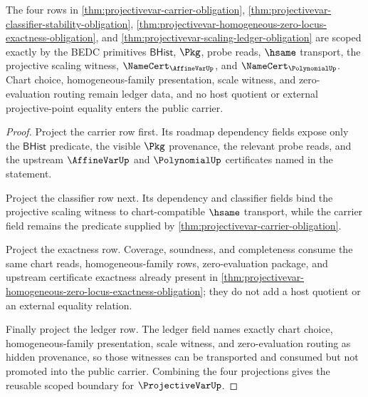 \begin{theorem}
\label{thm:projectivevar-scoped-primitive-binding}
The four rows in \autoref{thm:projectivevar-carrier-obligation}, \autoref{thm:projectivevar-classifier-stability-obligation}, \autoref{thm:projectivevar-homogeneous-zero-locus-exactness-obligation}, and \autoref{thm:projectivevar-scaling-ledger-obligation} are scoped exactly by the BEDC primitives $\mathsf{BHist}$, $\Pkg$, probe reads, $\hsame$ transport, the projective scaling witness, $\NameCert_{\AffineVarUp}$, and $\NameCert_{\PolynomialUp}$. Chart choice, homogeneous-family presentation, scale witness, and zero-evaluation routing remain ledger data, and no host quotient or external projective-point equality enters the public carrier.
\end{theorem}
\begin{proof}
Project the carrier row first. Its roadmap dependency fields expose only the $\mathsf{BHist}$ predicate, the visible $\Pkg$ provenance, the relevant probe reads, and the upstream $\AffineVarUp$ and $\PolynomialUp$ certificates named in the statement.

Project the classifier row next. Its dependency and classifier fields bind the projective scaling witness to chart-compatible $\hsame$ transport, while the carrier field remains the predicate supplied by \autoref{thm:projectivevar-carrier-obligation}.

Project the exactness row. Coverage, soundness, and completeness consume the same chart reads, homogeneous-family rows, zero-evaluation package, and upstream certificate exactness already present in \autoref{thm:projectivevar-homogeneous-zero-locus-exactness-obligation}; they do not add a host quotient or an external equality relation.

Finally project the ledger row. The ledger field names exactly chart choice, homogeneous-family presentation, scale witness, and zero-evaluation routing as hidden provenance, so those witnesses can be transported and consumed but not promoted into the public carrier. Combining the four projections gives the reusable scoped boundary for $\ProjectiveVarUp$.
\end{proof}

